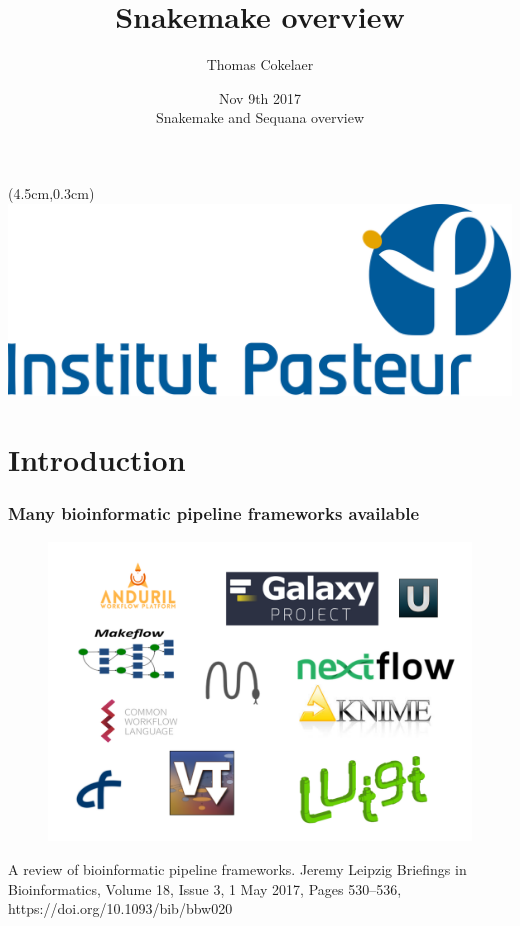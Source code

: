 \documentclass{beamer}
\title{Snakemake overview}
\author[T.Cokelaer]{Thomas Cokelaer}
\institute{Institut Pasteur}
\date{Nov 9th 2017\\ Snakemake and Sequana overview}
\begin{document}

\begin{frame}[plain]
    \titlepage
    \begin{textblock*}{5cm}(4.5cm,0.3cm)
        \includegraphics[scale=0.09]{images/Institut_Pasteur.png}
    \end{textblock*}
\end{frame}


\section{Introduction}


\begin{frame}
\frametitle{Many bioinformatic pipeline frameworks available}
\centering
 \begin{figure}
 \includegraphics[scale=0.23]{images/workflows.png}
 \end{figure}
 A review of bioinformatic pipeline frameworks. Jeremy Leipzig
Briefings in Bioinformatics, Volume 18, Issue 3, 1 May 2017, Pages 530–536, 
https://doi.org/10.1093/bib/bbw020

 \end{frame}
\end{document}
